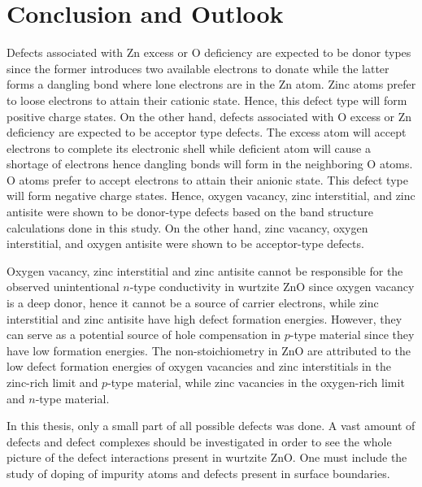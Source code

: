 \chapter{Conclusion and Outlook} \label{chap:conclu}
\vspace{-1em}
Defects associated with Zn excess or O deficiency are expected to be donor types since the former introduces two available electrons to donate while the latter forms a dangling bond where lone electrons are in the Zn atom. Zinc atoms prefer to loose electrons to attain their cationic state. Hence, this defect type will form  positive charge states. On the other hand, defects associated with O excess or Zn deficiency are expected to be acceptor type defects. The excess  atom will accept electrons to complete its electronic shell while deficient  atom will cause a shortage of electrons hence  dangling bonds will form in the neighboring O atoms. O atoms prefer to accept electrons to attain their anionic state.
This defect type will form  negative charge states. Hence, oxygen vacancy, zinc interstitial, and zinc antisite were shown to be donor-type defects based on the band structure calculations done in this study. On the other hand, zinc vacancy, oxygen interstitial, and oxygen antisite were shown to be acceptor-type defects.

Oxygen vacancy,  zinc interstitial and zinc antisite cannot be responsible for the observed unintentional $n$-type conductivity in wurtzite ZnO since oxygen vacancy is a deep donor, hence it cannot be a source of carrier electrons, while  zinc interstitial and zinc antisite have high defect formation energies. However, they can serve as a potential source of hole compensation in  $p$-type material since they have low formation energies. The non-stoichiometry in ZnO are attributed to the low defect formation energies of oxygen vacancies and  zinc interstitials in the zinc-rich limit and $p$-type material, while zinc vacancies in the oxygen-rich limit and $n$-type material.

In this thesis, only a small part of all possible defects was done.  A vast amount of defects and defect complexes should be investigated in order to see the whole picture of the defect interactions present in wurtzite ZnO. One must include the study of  doping of impurity atoms and defects present in surface boundaries. 


